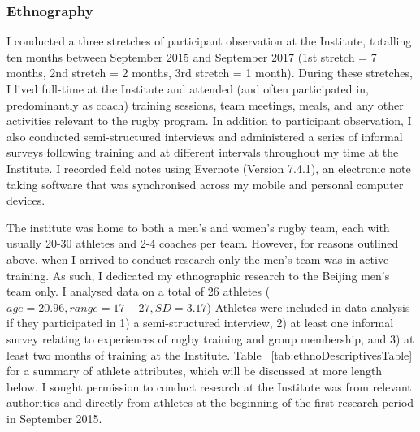 \begin{CJK}{UTF8}{gbsn}
 \subsubsection{Ethnography}
 I conducted a three stretches of participant observation at the Institute, totalling ten months between September 2015 and September 2017 (1st stretch = 7 months, 2nd stretch = 2 months, 3rd stretch = 1 month).  During these stretches, I lived full-time at the Institute and attended (and often participated in, predominantly as coach) training sessions, team meetings, meals, and any other activities relevant to the rugby program.  In addition to participant observation, I also conducted semi-structured interviews and administered a series of informal surveys following training and at different intervals throughout my time at the Institute.  I recorded field notes using Evernote (Version 7.4.1), an electronic note taking software that was synchronised across my mobile and personal computer devices.

 The institute was home to both a men's and women's rugby team, each with usually 20-30 athletes and 2-4 coaches per team.  However, for reasons outlined above, when I arrived to conduct research only the men's team was in active training.  As such, I dedicated my ethnographic research to the Beijing men's team only.  I analysed data on a total of 26 athletes ($age = 20.96, range = 17-27, SD = 3.17$)   Athletes were included in data analysis if they participated in 1) a semi-structured interview, 2) at least one informal survey relating to experiences of rugby training and group membership, and 3) at least two months of training at the Institute. Table ~\ref{tab:ethnoDescriptivesTable} for a summary of athlete attributes, which will be discussed at more length below.  I sought permission to conduct research at the Institute was from relevant authorities and directly from athletes at the beginning of the first research period in September 2015.

 


\end{CJK}

